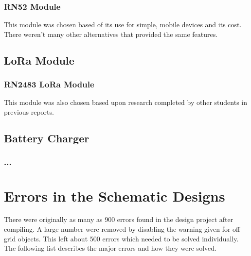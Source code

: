 \subsubsection{RN52 Module}
	This module was chosen based of its use for simple, mobile devices and its cost. There weren't many other alternatives that provided the same features. 


\subsection{LoRa Module}
\subsubsection{RN2483 LoRa Module}
	This module was also chosen based upon research completed by other students in previous reports.


\subsection{Battery Charger}
\subsubsection{...}
		


\section{Errors in the Schematic Designs}

There were originally as many as 900 errors found in the design project after compiling. A large number were removed by disabling the warning given for off-grid objects. This left about 500 errors which needed to be solved individually. The following list describes the major errors and how they were solved.


